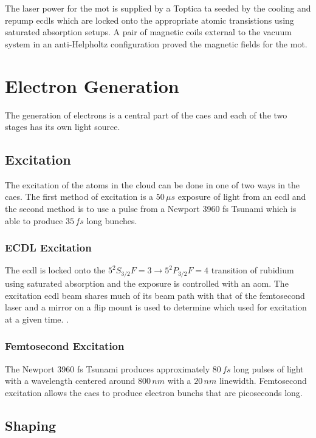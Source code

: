 The laser power for the \gls{mot} is supplied by a Toptica \gls{ta} seeded by the cooling and repump \glspl{ecdl} which are locked onto the appropriate atomic transistions using saturated absorption setups. A pair of magnetic coils external to the vacuum system in an anti-Helpholtz configuration proved the magnetic fields for the \gls{mot}.

\section{Electron Generation}

The generation of electrons is a central part of the \gls{caes} and each of the two stages has its own light source.

\subsection{Excitation}

The excitation of the atoms in the cloud can be done in one of two ways in the \gls{caes}. The first method of excitation is a $50\,\unit{\mu s}$ exposure of light from an \gls{ecdl} and the second method is to use a pulse from a Newport 3960 fs Tsunami which is able to produce $35\,\unit{fs}$ long bunches.

\subsubsection{ECDL Excitation}

The \gls{ecdl} is locked onto the $5 ^2 S_{3/2} F=3\rightarrow5 ^2 P_{3/2} F=4$ transition of rubidium using saturated absorption and the exposure is controlled with an \gls{aom}. The excitation \gls{ecdl} beam shares much of its beam path with that of the femtosecond laser and a mirror on a flip mount is used to determine which used for excitation at a given time.
.
\subsubsection{Femtosecond Excitation}

The Newport 3960 fs Tsunami produces approximately $80\,\unit{fs}$ long pulses of light with a wavelength centered around $800\,\unit{nm}$ with a $20\,\unit{nm}$ linewidth.\cite{mcculloch_towards_2012} Femtosecond excitation allows the \gls{caes} to produce electron bunchs that are picoseconds long.

\subsection{Shaping}

